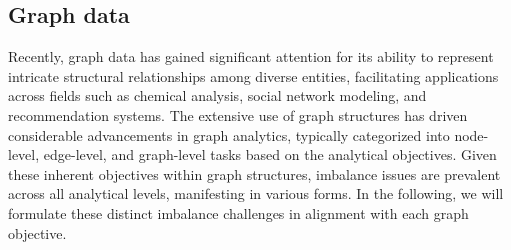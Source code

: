 


\subsection{Graph data}
Recently, graph data has gained significant attention for its ability to represent intricate structural relationships among diverse entities, facilitating applications across fields such as chemical analysis, social network modeling, and recommendation systems. The extensive use of graph structures has driven considerable advancements in graph analytics, typically categorized into node-level, edge-level, and graph-level tasks based on the analytical objectives. Given these inherent objectives within graph structures, imbalance issues are prevalent across all analytical levels, manifesting in various forms. In the following, we will formulate these distinct imbalance challenges in alignment with each graph objective.

